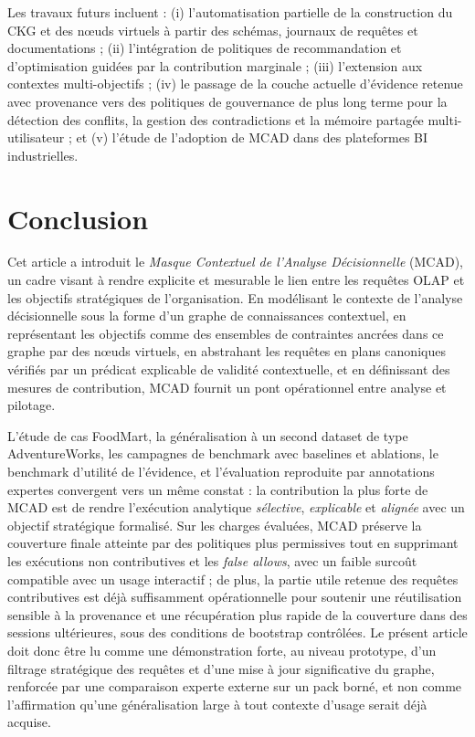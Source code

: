 \documentclass[journal]{IEEEtran}
\begin{document}
Les travaux futurs incluent : (i) l'automatisation partielle de la construction du CKG et des nœuds virtuels à partir des schémas, journaux de requêtes et documentations ; (ii) l'intégration de politiques de recommandation et d'optimisation guidées par la contribution marginale ; (iii) l'extension aux contextes multi-objectifs ; (iv) le passage de la couche actuelle d'évidence retenue avec provenance vers des politiques de gouvernance de plus long terme pour la détection des conflits, la gestion des contradictions et la mémoire partagée multi-utilisateur ; et (v) l'étude de l'adoption de MCAD dans des plateformes BI industrielles.

\section{Conclusion}
\label{sec:conclusion}

Cet article a introduit le \emph{Masque Contextuel de l'Analyse Décisionnelle} (MCAD), un cadre visant à rendre explicite et mesurable le lien entre les requêtes OLAP et les objectifs stratégiques de l'organisation. En modélisant le contexte de l'analyse décisionnelle sous la forme d'un graphe de connaissances contextuel, en représentant les objectifs comme des ensembles de contraintes ancrées dans ce graphe par des nœuds virtuels, en abstrahant les requêtes en plans canoniques vérifiés par un prédicat explicable de validité contextuelle, et en définissant des mesures de contribution, MCAD fournit un pont opérationnel entre analyse et pilotage.

L'étude de cas FoodMart, la généralisation à un second dataset de type AdventureWorks, les campagnes de benchmark avec baselines et ablations, le benchmark d'utilité de l'évidence, et l'évaluation reproduite par annotations expertes convergent vers un même constat : la contribution la plus forte de MCAD est de rendre l'exécution analytique \emph{sélective}, \emph{explicable} et \emph{alignée} avec un objectif stratégique formalisé. Sur les charges évaluées, MCAD préserve la couverture finale atteinte par des politiques plus permissives tout en supprimant les exécutions non contributives et les \emph{false allows}, avec un faible surcoût compatible avec un usage interactif ; de plus, la partie utile retenue des requêtes contributives est déjà suffisamment opérationnelle pour soutenir une réutilisation sensible à la provenance et une récupération plus rapide de la couverture dans des sessions ultérieures, sous des conditions de bootstrap contrôlées. Le présent article doit donc être lu comme une démonstration forte, au niveau prototype, d'un filtrage stratégique des requêtes et d'une mise à jour significative du graphe, renforcée par une comparaison experte externe sur un pack borné, et non comme l'affirmation qu'une généralisation large à tout contexte d'usage serait déjà acquise.
\end{document}
